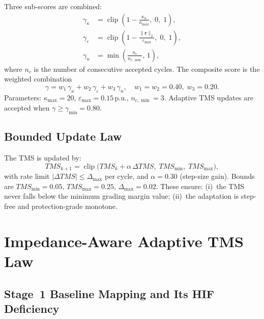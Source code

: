 \documentclass[10pt,journal,twoside]{IEEEtran}
\newcommand{\pu}{\,\text{p.u.}}
\newcommand{\tms}{TMS}
\newcommand{\kappan}{\kappa_n}
\newcommand{\gammin}{\gamma_{\min}}
\begin{document}
Three sub-scores are combined:
\begin{align}
\gamma_\kappa   &= \operatorname{clip}\!\left(
                   1 - \frac{\kappan}{\kappa_{\max}},\; 0,\; 1\right),
\label{eq:gamma_kappa}\\
\gamma_\varepsilon &= \operatorname{clip}\!\left(
                   1 - \frac{\|\mathbf{r}\|_2}{\varepsilon_{\max}},\; 0,\; 1\right),
\label{eq:gamma_eps}\\
\gamma_n        &= \min\!\left(\frac{n_c}{n_{c,\min}},\, 1\right),
\label{eq:gamma_n}
\end{align}
where $n_c$ is the number of consecutive accepted cycles.  The composite
score is the weighted combination
\begin{equation}
\gamma = w_1\,\gamma_\kappa + w_2\,\gamma_\varepsilon + w_3\,\gamma_n,
\quad w_1 = w_2 = 0.40,\; w_3 = 0.20.
\label{eq:gamma}
\end{equation}
Parameters: $\kappa_{\max} = 20$, $\varepsilon_{\max} = 0.15\pu$,
$n_{c,\min} = 3$.
Adaptive TMS updates are accepted when $\gamma \geq \gammin = 0.80$.

\subsection{Bounded Update Law}
\label{sec:estimation:bounded}

The TMS is updated by:
\begin{equation}
\tms_{k+1} = \operatorname{clip}\!\bigl(\tms_k +
              \alpha\,\Delta\tms,\;
              \tms_{\min},\; \tms_{\max}\bigr),
\label{eq:bounded}
\end{equation}
with rate limit $|\Delta\tms| \leq \Delta_{\max}$ per cycle, and
$\alpha = 0.30$ (step-size gain).  Bounds are $\tms_{\min} = 0.05$,
$\tms_{\max} = 0.25$, $\Delta_{\max} = 0.02$.  These ensure:
(i)~the TMS never falls below the minimum grading margin value;
(ii)~the adaptation is step-free and protection-grade monotone.

\section{Impedance-Aware Adaptive TMS Law}
\label{sec:tmslaw}

\subsection{Stage~1 Baseline Mapping and Its HIF Deficiency}
\label{sec:tmslaw:baseline}
\end{document}
